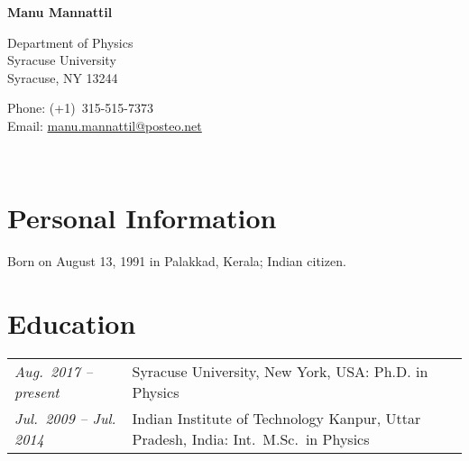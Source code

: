 \documentclass[10pt]{article}
\newcommand{\fname}{Manu Mannattil}             %
\providecommand{\email}[1]{\href{mailto:#1}{#1}}
\begin{document}

{\bfseries\large\fname}
\medskip

\begin{minipage}[t]{0.45\textwidth}
  Department of Physics\\
  Syracuse University\\
  Syracuse, NY 13244
\end{minipage}
%
\begin{minipage}[t]{0.45\textwidth}
  Phone: (+1)~315-515-7373\\
  Email: \email{manu.mannattil@posteo.net}
\end{minipage}\\


\section*{Personal Information}

Born on August 13, 1991 in Palakkad, Kerala; Indian citizen.


\section*{Education}

\begin{tabular}{@{}ll}
  \emph{Aug.~2017 -- present}   & Syracuse University, New York, USA: Ph.D. in Physics\\
  \emph{Jul.~2009 -- Jul. 2014} & Indian Institute of Technology Kanpur, Uttar Pradesh, India: Int.~M.Sc.~in Physics\\
\end{tabular}
\end{document}
